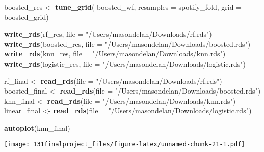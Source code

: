 \documentclass[
]{article}
\newenvironment{Shaded}{\begin{snugshade}}{\end{snugshade}}
\newcommand{\AttributeTok}[1]{\textcolor[rgb]{0.13,0.29,0.53}{#1}}
\newcommand{\FunctionTok}[1]{\textcolor[rgb]{0.13,0.29,0.53}{\textbf{#1}}}
\newcommand{\NormalTok}[1]{#1}
\newcommand{\OtherTok}[1]{\textcolor[rgb]{0.56,0.35,0.01}{#1}}
\newcommand{\StringTok}[1]{\textcolor[rgb]{0.31,0.60,0.02}{#1}}
\begin{document}
\begin{Shaded}
\begin{Highlighting}[]
\NormalTok{boosted\_res }\OtherTok{\textless{}{-}} \FunctionTok{tune\_grid}\NormalTok{(}
\NormalTok{ boosted\_wf,}
  \AttributeTok{resamples =}\NormalTok{ spotify\_fold,}
  \AttributeTok{grid =}\NormalTok{ boosted\_grid)}
\end{Highlighting}
\end{Shaded}

\begin{Shaded}
\begin{Highlighting}[]
\FunctionTok{write\_rds}\NormalTok{(rf\_res, }\AttributeTok{file =} \StringTok{"/Users/masondelan/Downloads/rf.rds"}\NormalTok{)}
\FunctionTok{write\_rds}\NormalTok{(boosted\_res, }\AttributeTok{file =} \StringTok{"/Users/masondelan/Downloads/boosted.rds"}\NormalTok{)}
\FunctionTok{write\_rds}\NormalTok{(knn\_res, }\AttributeTok{file =} \StringTok{"/Users/masondelan/Downloads/knn.rds"}\NormalTok{)}
\FunctionTok{write\_rds}\NormalTok{(logistic\_res, }\AttributeTok{file =} \StringTok{"/Users/masondelan/Downloads/logistic.rds"}\NormalTok{)}
\end{Highlighting}
\end{Shaded}

\begin{Shaded}
\begin{Highlighting}[]
\NormalTok{rf\_final }\OtherTok{\textless{}{-}} \FunctionTok{read\_rds}\NormalTok{(}\AttributeTok{file =} \StringTok{"/Users/masondelan/Downloads/rf.rds"}\NormalTok{)}
\NormalTok{boosted\_final }\OtherTok{\textless{}{-}} \FunctionTok{read\_rds}\NormalTok{(}\AttributeTok{file =} \StringTok{"/Users/masondelan/Downloads/boosted.rds"}\NormalTok{)}
\NormalTok{knn\_final }\OtherTok{\textless{}{-}} \FunctionTok{read\_rds}\NormalTok{(}\AttributeTok{file =} \StringTok{"/Users/masondelan/Downloads/knn.rds"}\NormalTok{)}
\NormalTok{linear\_final }\OtherTok{\textless{}{-}} \FunctionTok{read\_rds}\NormalTok{(}\AttributeTok{file =} \StringTok{"/Users/masondelan/Downloads/logistic.rds"}\NormalTok{)}
\end{Highlighting}
\end{Shaded}

\begin{Shaded}
\begin{Highlighting}[]
\FunctionTok{autoplot}\NormalTok{(knn\_final)}
\end{Highlighting}
\end{Shaded}

\texttt{[image: 131finalproject\_files/figure-latex/unnamed-chunk-21-1.pdf]}
\end{document}
